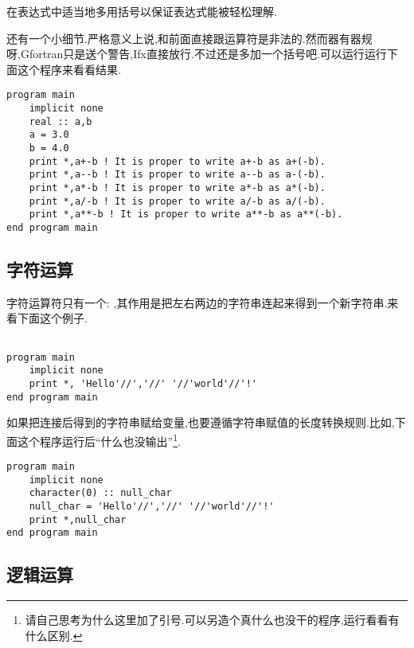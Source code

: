 \begin{convention}\label{use_barket}
    在表达式中适当地多用括号以保证表达式能被轻松理解.
\end{convention}

还有一个小细节.严格意义上说,\ttt{+}和\ttt{-}前面直接跟运算符是非法的.然而器有器规呀,Gfortran只是送个警告,Ifx直接放行.不过还是多加一个括号吧.可以运行运行下面这个程序来看看结果.
\begin{lstlisting}
program main
    implicit none
    real :: a,b
    a = 3.0
    b = 4.0
    print *,a+-b ! It is proper to write a+-b as a+(-b).
    print *,a--b ! It is proper to write a--b as a-(-b).
    print *,a*-b ! It is proper to write a*-b as a*(-b).
    print *,a/-b ! It is proper to write a/-b as a/(-b).
    print *,a**-b ! It is proper to write a**-b as a**(-b).
end program main
\end{lstlisting}

\subsection{字符运算}\label{fortran_char_operator}

字符运算符只有一个: \ttt{//},其作用是把左右两边的字符串连起来得到一个新字符串.来看下面这个例子.
\begin{lstlisting}

program main
    implicit none
    print *, 'Hello'//','//' '//'world'//'!'
end program main
\end{lstlisting}

如果把连接后得到的字符串赋给变量,也要遵循字符串赋值的长度转换规则.比如,下面这个程序运行后``什么也没输出''\footnote{
    请自己思考为什么这里加了引号.可以另造个真什么也没干的程序,运行看看有什么区别.
}.
\begin{lstlisting}
program main
    implicit none
    character(0) :: null_char
    null_char = 'Hello'//','//' '//'world'//'!'
    print *,null_char
end program main
\end{lstlisting}

\subsection{逻辑运算}

